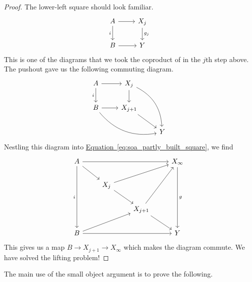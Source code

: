 \documentclass[main.tex]{subfiles}
\begin{document}
\begin{proof}
  The lower-left square should look familiar.
  \begin{equation*}
    \begin{tikzcd}
      A
      \arrow[r]
      \arrow[d, swap, "i"]
      & X_{j}
      \arrow[d, "g_{j}"]
      \\
      B
      \arrow[r]
      & Y
    \end{tikzcd}
  \end{equation*}
  This is one of the diagrams that we took the coproduct of in the $j$th step above. The pushout gave us the following commuting diagram.
  \begin{equation*}
    \begin{tikzcd}
      A
      \arrow[r]
      \arrow[d, swap, "i"]
      & X_{j}
      \arrow[ddr, bend left]
      \arrow[d, swap]
      \\
      B
      \arrow[r]
      \arrow[rrd, bend right]
      & X_{j+1}
      \arrow[rd]
      \\
      & & Y
    \end{tikzcd}
  \end{equation*}
  Nestling this diagram into \hyperref[eq:soa_partly_built_square]{Equation~\ref*{eq:soa_partly_built_square}}, we find
  \begin{equation*}
    \begin{tikzcd}
      A
      \arrow[rrr]
      \arrow[ddd, swap, "i"]
      \arrow[rd]
      &&& X_{\infty}
      \arrow[ddd, "g"]
      \\
      & X_{j}
      \arrow[urr]
      \arrow[dr]
      \\
      && X_{j+1}
      \arrow[uur]
      \arrow[rd]
      \\
      B
      \arrow[rrr]
      \arrow[urr]
      &&& Y
    \end{tikzcd}
  \end{equation*}
  This gives us a map $B \to X_{j+1} \to X_{\infty}$ which makes the diagram commute. We have solved the lifting problem!
\end{proof}

The main use of the small object argument is to prove the following.
\end{document}

